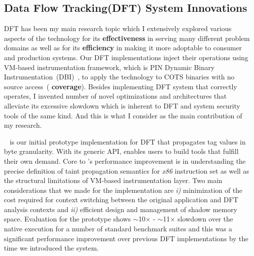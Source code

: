 \documentclass[letterpaper, 10pt]{article}
\begin{document}
\begin{small}
\subsection*{Data Flow Tracking(DFT) System Innovations}
%
DFT has been my main research topic which I extensively explored various
aspects of the technology for its {\bf effectiveness} in serving many different
problem domains as well as for its {\bf efficiency} in making it more adoptable
to consumer and production systems.
%
%
Our DFT implementations inject their operations using VM-based instrumentation
framework, which is PIN Dynamic Binary Instrumentation~(DBI)~\cite{pin}, to
apply the technology to COTS binaries with no source access~({\bf
coverage}).
%
Besides implementing DFT system that correctly operates, I invented number of
novel optimizations and architectures that alleviate its excessive slowdown
which is inherent to DFT and system security tools of the same kind. And this
is what I consider as the main contribution of my research.


\libdft~\cite{libdft:2012vee} is our initial prototype implementation for DFT
that propagates tag values in byte granularity.
%
With its generic API, \libdft enables users to build tools that fulfill their
own demand. 
%
%
Core to \libdft's performance improvement is in understanding the precise
definition of taint propagation semantics for {\it x86} instruction set as well
as the structural limitations of VM-based instrumentation layer. 
%
%
Two main considerations that we made for the implementation are {\it i)}
minimization of the cost required for context switching between the original
application and DFT analysis contexts and {\it ii)} efficient design and
management of shadow memory space.
%
Evaluation for the prototype shows $\sim$10$\times$ - $\sim$11$\times$ slowdown
over the native execution for a number of standard benchmark suites and this
was a significant performance improvement over previous DFT implementations by
the time we introduced the system.


\end{small}
\end{document}

